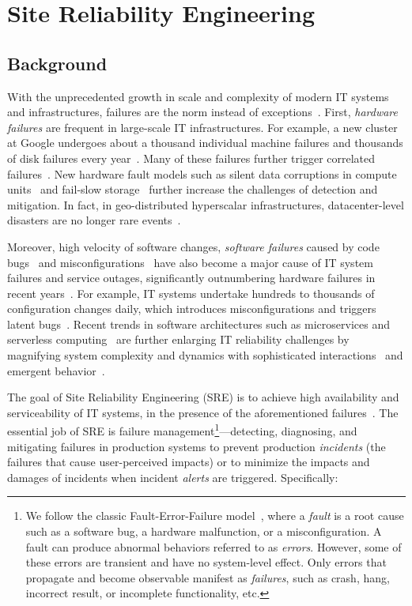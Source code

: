\section{Site Reliability Engineering}
\label{appx:sre}



\subsection{Background}
\label{ss:sre-background}
With the unprecedented growth in scale and complexity of modern IT systems and infrastructures, failures are the norm instead of exceptions~\cite{patterson:02,gunawi:16,kendrick:12,dimartinoDSN2014,veeraraghavan:osdi:18,Liu:2019,Ghosh:22}. First, {\it hardware failures} are frequent in large-scale IT infrastructures. For example, a new cluster at Google undergoes about a thousand individual machine failures and thousands of disk failures every year~\cite{Dean:2009}. Many of these failures further trigger correlated failures~\cite{ford:10}. New hardware fault models such as silent data corruptions in compute units~\cite{Hochschild:2021} and fail-slow storage~\cite{Gunawi:2018} further increase the challenges of detection and mitigation. In fact, in geo-distributed hyperscalar infrastructures, datacenter-level disasters are no longer rare events~\cite{veeraraghavan:osdi:18}.

Moreover, high velocity of software changes, {\it software failures} caused by code bugs~\cite{Gunawi:14} and misconfigurations~\cite{xu:13} have also become a major cause of IT system failures and service outages, significantly outnumbering hardware failures in recent years~\cite{maurer:15,Barroso:2018}.
For example, IT systems undertake hundreds to thousands of configuration changes daily, which introduces misconfigurations and triggers latent bugs~\cite{sun:osdi:20,tang:15}.
Recent trends in software architectures such as microservices and serverless computing~\cite{Jonas:19} are further enlarging IT reliability challenges by magnifying system complexity and dynamics with sophisticated interactions~\cite{tang:eurosys:23} and emergent behavior~\cite{Huang:2022}. 

The goal of Site Reliability Engineering (SRE) is to achieve high availability and serviceability of IT systems, in the presence of the aforementioned failures~\cite{srehandbook}. The essential job of SRE is failure management\footnote{\scriptsize We follow the classic Fault-Error-Failure model~\cite{aviz:04}, where a {\it fault} is a root cause such as a software bug, a hardware malfunction, or a misconfiguration. A fault can produce abnormal behaviors referred to as {\it errors}. However, some of these errors are transient and have no system-level effect. Only errors that propagate and become observable manifest as {\it failures}, such as crash, hang, incorrect result, or incomplete functionality, etc.}---detecting, diagnosing, and mitigating failures in production systems to prevent production {\it incidents} (the failures that cause user-perceived impacts) or to minimize the impacts and damages of incidents when incident {\it alerts} are triggered. Specifically:

